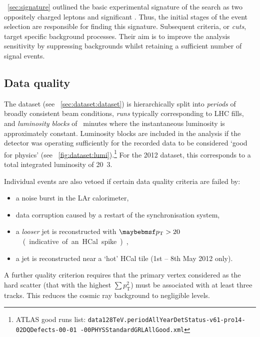 
\Section~\ref{sec:signature} outlined the basic experimental signature of the search as 
two oppositely charged leptons and significant \met. Thus, the initial stages of the 
event selection are responsible for finding this signature. Subsequent criteria, or 
\textit{cuts}, target specific background processes. Their aim is to improve the analysis 
sensitivity by suppressing backgrounds whilst retaining a sufficient number of signal events.



\subsection{Data quality}
\label{sec:selection:quality}

The \pp dataset (see \Section~\ref{sec:dataset:dataset}) is hierarchically split into 
\textit{periods} of broadly consistent beam conditions, \textit{runs} typically 
corresponding to LHC fills, and \textit{luminosity blocks} of ~minutes where the 
instantaneous luminosity is approximately constant. Luminosity blocks are included in the 
analysis if the detector was operating sufficiently for the recorded data to be 
considered `good for physics' (see \Figure~\ref{fig:dataset:lumi}).\footnote{
	ATLAS good runs list: \texttt{data128TeV.periodAllYearDetStatus-v61-pro14-02DQDefects-00-01
	-00PHYSStandardGRLAllGood.xml}
} 
For the 2012 dataset, this corresponds to a total integrated luminosity of 
\unit{20.3}{\invfb}.

Individual events are also vetoed if certain data quality criteria are failed by:
\begin{itemize}[noitemsep,nolistsep]
	\item a noise burst in the LAr calorimeter,
	\item data corruption caused by a restart of the synchronisation system,
	\item a \textit{looser} jet is reconstructed with \unit{$\pt > 20$}{\GeV} (indicative 
	of an HCal spike),
	\item a jet is reconstructed near a `hot' HCal tile (1st -- 8th May 2012 only).
\end{itemize}
A further quality criterion requires that the primary vertex considered as the hard 
scatter (that with the highest $\sum p_{\text{T}}^2$) must be associated with at least 
three tracks. This reduces the cosmic ray background to negligible levels.



